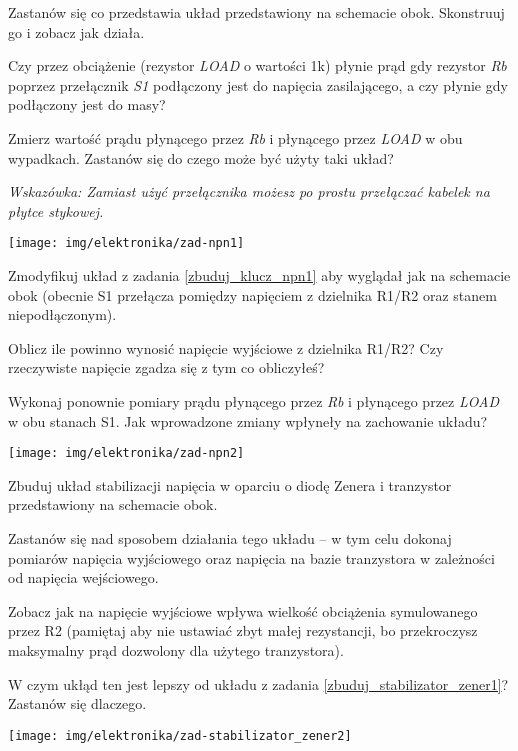 \dbEntryCheckResults
\noindent\begin{minipage}[b]{0.6\textwidth}
Zastanów się co przedstawia układ przedstawiony na schemacie obok. Skonstruuj go i zobacz jak działa.

Czy przez obciążenie (rezystor \textit{LOAD} o wartości 1k) płynie prąd gdy rezystor \textit{Rb} poprzez przełącznik \textit{S1} podłączony jest do napięcia zasilającego, a czy płynie gdy podłączony jest do masy?

Zmierz wartość prądu płynącego przez \textit{Rb} i płynącego przez \textit{LOAD} w obu wypadkach. Zastanów się do czego może być użyty taki układ?

\textit{Wskazówka: Zamiast użyć przełącznika możesz po prostu przełączać kabelek na płytce stykowej.}
\end{minipage}
\hfill
\begin{minipage}[b]{0.35\textwidth}
\texttt{[image: img/elektronika/zad-npn1]}
\end{minipage}
\fi


\dbEntryCheckResults
\noindent\begin{minipage}[b]{0.5\textwidth}
Zmodyfikuj układ z zadania \ref{zbuduj_klucz_npn1} aby wyglądał jak na schemacie obok (obecnie S1 przełącza pomiędzy napięciem z dzielnika R1/R2 oraz stanem niepodłączonym).

Oblicz ile powinno wynosić napięcie wyjściowe z dzielnika R1/R2? Czy rzeczywiste napięcie zgadza się z tym co obliczyłeś?

Wykonaj ponownie pomiary prądu płynącego przez \textit{Rb} i płynącego przez \textit{LOAD} w obu stanach S1.
Jak wprowadzone zmiany wpłyneły na zachowanie układu?
\end{minipage}
\hfill
\begin{minipage}[b]{0.45\textwidth}
\texttt{[image: img/elektronika/zad-npn2]}
\end{minipage}
\fi


\dbEntryCheckResults
\noindent\begin{minipage}[b]{0.7\textwidth}
Zbuduj układ stabilizacji napięcia w oparciu o diodę Zenera i tranzystor przedstawiony na schemacie obok.

Zastanów się nad sposobem działania tego układu – w tym celu dokonaj pomiarów napięcia wyjściowego oraz napięcia na bazie tranzystora w zależności od napięcia wejściowego.

Zobacz jak na napięcie wyjściowe wpływa wielkość obciążenia symulowanego przez R2 (pamiętaj aby nie ustawiać zbyt małej rezystancji, bo przekroczysz maksymalny prąd dozwolony dla użytego tranzystora).

W czym ukłąd ten jest lepszy od układu z zadania \ref{zbuduj_stabilizator_zener1}? Zastanów się dlaczego.
\end{minipage}
\hfill
\begin{minipage}[b]{0.25\textwidth}
\texttt{[image: img/elektronika/zad-stabilizator\_zener2]}
\end{minipage}
\fi


